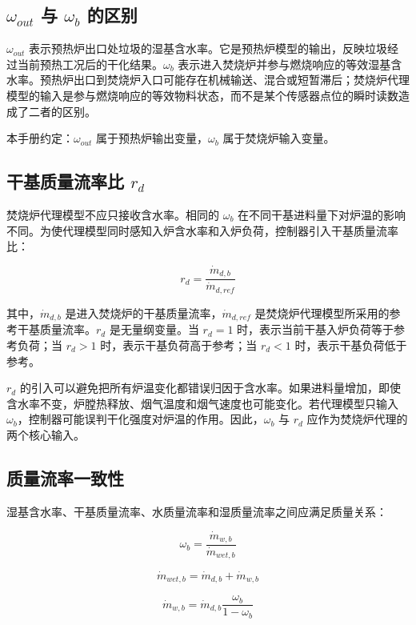 \documentclass[UTF8,openany,zihao=-4,oneside]{ctexbook}
\begin{document}
\subsection{\texorpdfstring{$\omega_{out}$}{omega out} 与 \texorpdfstring{$\omega_b$}{omega b} 的区别}\label{subsec:omega-out-b}

\(\omega_{out}\) 表示预热炉出口处垃圾的湿基含水率。它是预热炉模型的输出，反映垃圾经过当前预热工况后的干化结果。\(\omega_b\) 表示进入焚烧炉并参与燃烧响应的等效湿基含水率。预热炉出口到焚烧炉入口可能存在机械输送、混合或短暂滞后；焚烧炉代理模型的输入是参与燃烧响应的等效物料状态，而不是某个传感器点位的瞬时读数造成了二者的区别。

本手册约定：\(\omega_{out}\) 属于预热炉输出变量，\(\omega_b\) 属于焚烧炉输入变量。

\subsection{干基质量流率比 \texorpdfstring{$r_d$}{rd}}\label{subsec:rd}

焚烧炉代理模型不应只接收含水率。相同的 \(\omega_b\) 在不同干基进料量下对炉温的影响不同。为使代理模型同时感知入炉含水率和入炉负荷，控制器引入干基质量流率比：

\[
r_d=\frac{\dot m_{d,b}}{\dot m_{d,ref}}
\]

其中，\(\dot m_{d,b}\) 是进入焚烧炉的干基质量流率，\(\dot m_{d,ref}\) 是焚烧炉代理模型所采用的参考干基质量流率。\(r_d\) 是无量纲变量。当 \(r_d=1\) 时，表示当前干基入炉负荷等于参考负荷；当 \(r_d>1\) 时，表示干基负荷高于参考；当 \(r_d<1\) 时，表示干基负荷低于参考。

\(r_d\) 的引入可以避免把所有炉温变化都错误归因于含水率。如果进料量增加，即使含水率不变，炉膛热释放、烟气温度和烟气速度也可能变化。若代理模型只输入 \(\omega_b\)，控制器可能误判干化强度对炉温的作用。因此，\(\omega_b\) 与 \(r_d\) 应作为焚烧炉代理的两个核心输入。

\subsection{质量流率一致性}\label{subsec:mass-flow-consistency}

湿基含水率、干基质量流率、水质量流率和湿质量流率之间应满足质量关系：

\[
\omega_b=\frac{\dot m_{w,b}}{\dot m_{wet,b}}
\]

\[
\dot m_{wet,b}=\dot m_{d,b}+\dot m_{w,b}
\]

\[
\dot m_{w,b}=\dot m_{d,b}\frac{\omega_b}{1-\omega_b}
\]
\end{document}
